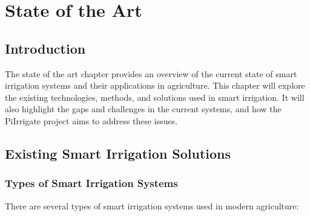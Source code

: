 \chapter{State of the Art}\label{section:stateoftheart}

\section{Introduction}
The state of the art chapter provides an overview of the current state of smart irrigation 
systems and their applications in agriculture. 
This chapter will explore the existing technologies, methods, and solutions used in smart irrigation. 
It will also highlight the gaps and challenges in the current systems,
and how the PiIrrigate project aims to address these issues.

\section{Existing Smart Irrigation Solutions}
\subsection{Types of Smart Irrigation Systems}

There are several types of smart irrigation systems used in modern agriculture:

